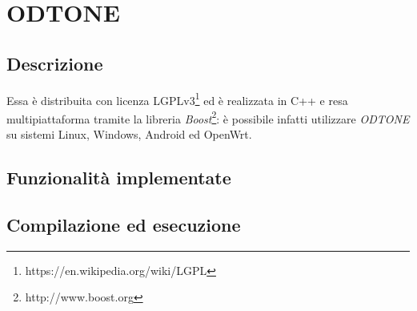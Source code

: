 \chapter{ODTONE}

\section{Descrizione}
Essa è distribuita con licenza LGPLv3\footnote{https://en.wikipedia.org/wiki/LGPL} ed è realizzata in C++ e resa multipiattaforma tramite la libreria {\em Boost}\footnote{http://www.boost.org}: è possibile infatti utilizzare {\em ODTONE} su sistemi Linux, Windows, Android ed OpenWrt.

\section{Funzionalità implementate}

\section{Compilazione ed esecuzione}